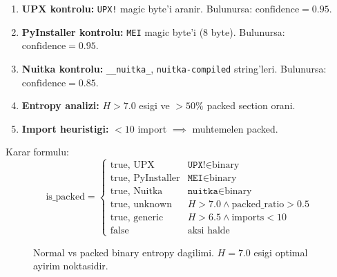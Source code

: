 \begin{enumerate}
\item \textbf{UPX kontrolu:} \texttt{UPX!} magic byte'i aranir. Bulunursa: $\text{confidence} = 0.95$.
\item \textbf{PyInstaller kontrolu:} \texttt{MEI} magic byte'i (8 byte). Bulunursa: $\text{confidence} = 0.95$.
\item \textbf{Nuitka kontrolu:} \texttt{\_\_nuitka\_}, \texttt{nuitka-compiled} string'leri. Bulunursa: $\text{confidence} = 0.85$.
\item \textbf{Entropy analizi:} $H > 7.0$ esigi ve $>\!50\%$ packed section orani.
\item \textbf{Import heuristigi:} $<\!10$ import $\implies$ muhtemelen packed.
\end{enumerate}

Karar formulu:
\begin{equation}
\label{eq:packing-decision}
\text{is\_packed} =
\begin{cases}
\text{true, UPX} & \texttt{UPX!} \in \text{binary} \\
\text{true, PyInstaller} & \texttt{MEI} \in \text{binary} \\
\text{true, Nuitka} & \texttt{nuitka} \in \text{binary} \\
\text{true, unknown} & H > 7.0 \wedge \text{packed\_ratio} > 0.5 \\
\text{true, generic} & H > 6.5 \wedge \text{imports} < 10 \\
\text{false} & \text{aksi halde}
\end{cases}
\end{equation}

\begin{figure}[htbp]
\centering
{}
\caption{Normal vs packed binary entropy dagilimi. $H = 7.0$ esigi optimal ayirim noktasidir.}
\label{fig:entropy-distribution}
\end{figure}



